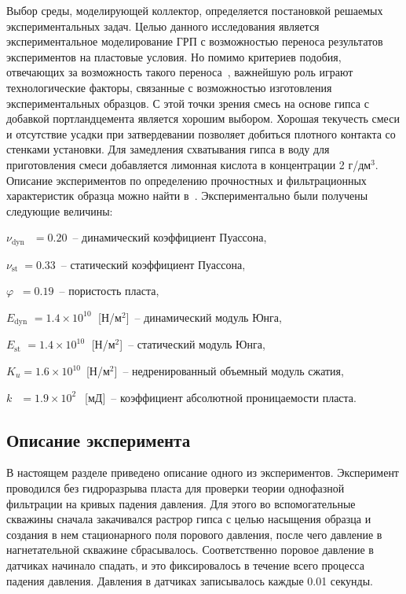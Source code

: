 Выбор среды, моделирующей коллектор, определяется постановкой решаемых экспериментальных задач. Целью данного исследования является экспериментальное моделирование ГРП с возможностью переноса результатов экспериментов на пластовые условия. Но помимо критериев подобия, отвечающих за возможность такого переноса~\cite{cleary1994}, важнейшую роль играют технологические факторы, связанные с возможностью изготовления экспериментальных образцов. С этой точки зрения смесь на основе гипса с добавкой портландцемента является хорошим выбором. Хорошая текучесть смеси и отсутствие усадки при затвердевании позволяет добиться плотного контакта со стенками установки. Для замедления схватывания гипса в воду для приготовления смеси добавляется лимонная кислота в концентрации 2 г/дм$^3$. Описание экспериментов по определению прочностных и фильтрационных характеристик образца можно найти  в~\cite{trimonova2017, trimonova2018}. Экспериментально были получены следующие величины:
\begin{description}
%
\item $\nu_\text{dyn} \;\;\,  = 0.20$~-- динамический коэффициент Пуассона,
\item $\nu_\text{st} \;= 0.33$~-- статический коэффициент Пуассона,
\item $\varphi \;\;= 0.19$~-- пористость пласта,
\item $E_\text{dyn} \,\,    = 1.4 \times 10^{10}\;$  [Н/м$^2$]~-- динамический модуль Юнга, 
\item $E_\text{st} \,\,    = 1.4 \times 10^{10}\;$  [Н/м$^2$]~-- статический модуль Юнга, 
\item $K_u   = 1.6 \times 10^{10}\,$ [Н/м$^2$]~-- недренированный объемный модуль сжатия,
\item $k \;\;\,    = 1.9 \times 10^2\;\,$  [мД]~-- коэффициент абсолютной проницаемости пласта.

%
\end{description}

\subsection{Описание эксперимента}

В настоящем разделе приведено описание одного из экспериментов. Эксперимент проводился без гидроразрыва пласта для  проверки теории однофазной фильтрации на кривых падения давления. Для этого во вспомогательные скважины сначала закачивался растрор гипса с целью насыщения образца и создания в нем стационарного поля порового давления, после чего давление в нагнетательной скважине сбрасывалось. Соответственно поровое давление в датчиках начинало спадать, и это фиксировалось в течение всего процесса падения давления. Давления в датчиках записывалось каждые 0.01 секунды. 

